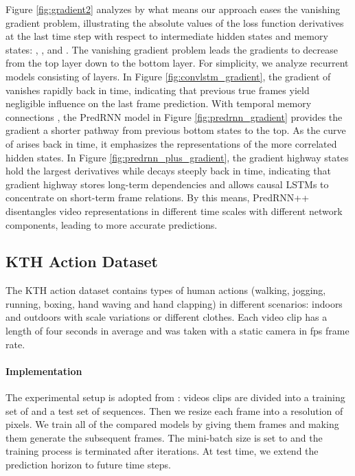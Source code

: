 \documentclass{article}
\begin{document}
Figure \ref{fig:gradient2} analyzes by what means our approach eases the vanishing gradient problem, illustrating the absolute values of the loss function derivatives at the last time step with respect to intermediate hidden states and memory states: , , and . The vanishing gradient problem leads the gradients to decrease from the top layer down to the bottom layer. For simplicity, we analyze recurrent models consisting of  layers. In Figure \ref{fig:convlstm_gradient}, the gradient of  vanishes rapidly back in time, indicating that previous true frames yield negligible influence on the last frame prediction. With temporal memory connections , the PredRNN model in Figure \ref{fig:predrnn_gradient} provides the gradient a shorter pathway from previous bottom states to the top. As the curve of  arises back in time, it emphasizes the representations of the more correlated hidden states. In Figure \ref{fig:predrnn_plus_gradient}, the gradient highway states  hold the largest derivatives while  decays steeply back in time, indicating that gradient highway stores long-term dependencies and allows causal LSTMs to concentrate on short-term frame relations. By this means, PredRNN++ disentangles video representations in different time scales with different network components, leading to more accurate predictions.









\subsection{KTH Action Dataset}

The KTH action dataset \cite{Sch2004Recognizing} contains  types of human actions (walking, jogging, running, boxing, hand waving and hand clapping) in different scenarios: indoors and outdoors with scale variations or different clothes. Each video clip has a length of four seconds in average and was taken with a static camera in  fps frame rate. 

\paragraph{Implementation} 
The experimental setup is adopted from \cite{Villegas2017Decomposing}: videos clips are divided into a training set of  and a test set of  sequences. Then we resize each frame into a resolution of  pixels. We train all of the compared models by giving them  frames and making them generate the subsequent  frames. The mini-batch size is set to  and the training process is terminated after  iterations. At test time, we extend the prediction horizon to  future time steps.
\end{document}
